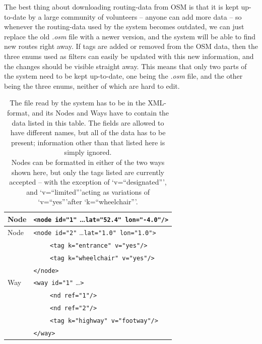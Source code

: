 The best thing about downloading routing-data from OSM is that it is kept up-to-date by a large community of volunteers -- anyone can add more data -- so whenever the routing-data used by the system becomes outdated, we can just replace the old \textit{.osm} file with a newer version, and the system will be able to find new routes right away. If tags are added or removed from the OSM data, then the three enums used as filters can easily be updated with this new information, and the changes should be visible straight away. This means that only two parts of the system need to be kept up-to-date, one being the \textit{.osm} file, and the other being the three enums, neither of which are hard to edit.

\begin{table}
	\begin{tabular}{| l | l |}
		\hline
		Node & \verb|<node id="1"| \dots \verb|lat="52.4" lon="-4.0"/>|  \\
		\hline
		\hline
		Node & \verb|<node id="2"| \dots \verb|lat="1.0" lon="1.0">|\\
			& ~~~~ \verb|<tag k="entrance" v="yes"/>|\\
			& ~~~~ \verb|<tag k="wheelchair" v="yes"/>|\\
		& \verb|</node>|\\
		\hline\hline
		Way & \verb|<way id="1"| \dots \verb|>|\\
			& ~~~~ \verb|<nd ref="1"/>|\\
			& ~~~~ \verb|<nd ref="2"/>|\\
			& ~~~~ \verb|<tag k="highway" v="footway"/>|\\
		& \verb|</way>|\\
		\hline
	\end{tabular}
	\caption[Structure of \textit{.osm} file]{The file read by the system has to be in the XML-format, and its Nodes and Ways have to contain the data listed in this table. The fields are allowed to have different names, but all of the data has to be present; information other than that listed here is simply ignored.\\Nodes can be formatted in either of the two ways shown here, but only the tags listed are currently accepted -- with the exception of \textquoteleft v=\textquotedblleft designated\textquotedblright\textquoteright, and \textquoteleft v=\textquotedblleft limited\textquotedblright\textquoteright acting as variations of \textquoteleft v=\textquotedblleft yes\textquotedblright\textquoteright after \textquoteleft k=\textquotedblleft wheelchair\textquotedblright\textquoteright.}
	\label{tab:nodeWayLables}
\end{table}

